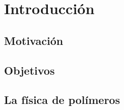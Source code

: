 \chapter{Introducción}
\label{cap:introduction}

\section{Motivación}

\section{Objetivos}

\section{La física de polímeros}


